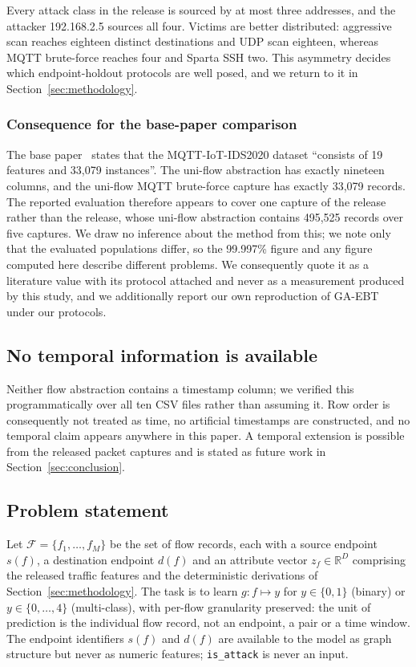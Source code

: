 Every attack class in the release is sourced by at most three addresses, and
the attacker 192.168.2.5 sources all four. Victims are better distributed:
aggressive scan reaches eighteen distinct destinations and UDP scan eighteen,
whereas MQTT brute-force reaches four and Sparta SSH two. This asymmetry
decides which endpoint-holdout protocols are well posed, and we return to it in
Section~\ref{sec:methodology}.

\subsubsection{Consequence for the base-paper comparison}

The base paper~\cite{norouzi2026reliable} states that the MQTT-IoT-IDS2020
dataset ``consists of 19 features and 33{,}079 instances''. The uni-flow
abstraction has exactly nineteen columns, and the uni-flow MQTT brute-force
capture has exactly 33{,}079 records. The reported evaluation therefore appears
to cover one capture of the release rather than the release, whose uni-flow
abstraction contains 495{,}525 records over five captures. We draw no inference
about the method from this; we note only that the evaluated populations differ,
so the 99.997\% figure and any figure computed here describe different
problems. We consequently quote it as a literature value with its protocol
attached and never as a measurement produced by this study, and we additionally
report our own reproduction of GA-EBT under our protocols.

\subsection{No temporal information is available}

Neither flow abstraction contains a timestamp column; we verified this
programmatically over all ten CSV files rather than assuming it. Row order is
consequently not treated as time, no artificial timestamps are constructed, and
no temporal claim appears anywhere in this paper. A temporal extension is
possible from the released packet captures and is stated as future work in
Section~\ref{sec:conclusion}.

\subsection{Problem statement}

Let $\mathcal{F} = \{f_1,\dots,f_M\}$ be the set of flow records, each with a
source endpoint $s(f)$, a destination endpoint $d(f)$ and an attribute vector
$z_f \in \mathbb{R}^{D}$ comprising the released traffic features and the
deterministic derivations of Section~\ref{sec:methodology}. The task is to
learn $g: f \mapsto y$ for $y \in \{0,1\}$ (binary) or
$y \in \{0,\dots,4\}$ (multi-class), with per-flow granularity preserved: the
unit of prediction is the individual flow record, not an endpoint, a pair or a
time window. The endpoint identifiers $s(f)$ and $d(f)$ are available to the
model as graph structure but never as numeric features; \texttt{is\_attack} is
never an input.
